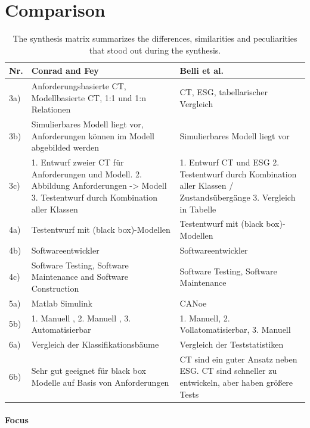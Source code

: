 \section{Comparison}
\label{Kap:Comparison}

\begin{small} 		
	\begin{longtable}[h]{p{0.45cm}|p{}|p{}}
	\caption{The synthesis matrix summarizes the differences, similarities and peculiarities that stood out during the synthesis.}
	\label{tab:synthesematrix_julian}
	\\    %
	\hline
	\textbf{Nr.} & \textbf{Conrad and Fey} & \textbf{Belli et al.} \\
	\hline
	3a) & Anforderungsbasierte CT, Modellbasierte CT,  1:1 und 1:n Relationen & CT, ESG, tabellarischer Vergleich \\
	\hline	
	3b) & Simulierbares Modell liegt vor, Anforderungen können im Modell abgebilded werden & Simulierbares Modell liegt vor \\
	\hline	
	3c) & 1. Entwurf zweier CT für Anforderungen und Modell. 2. Abbildung Anforderungen -> Modell 3. Testentwurf durch Kombination aller Klassen & 1. Entwurf CT und ESG 2. Testentwurf durch Kombination aller Klassen / Zustandsübergänge 3. Vergleich in Tabelle \\
	\hline	
	4a) & Testentwurf mit (black box)-Modellen & Testentwurf mit (black box)-Modellen \\
	\hline	
	4b) & Softwareentwickler & Softwareentwickler \\
	\hline	
	4c) & Software Testing, Software Maintenance and Software Construction & Software Testing, Software Maintenance \\
	\hline
	5a) & Matlab Simulink & CANoe \\
	\hline
	5b) & 1. Manuell , 2. Manuell , 3. Automatisierbar & 1. Manuell, 2. Vollatomatisierbar, 3. Manuell \\
	\hline	
	6a) & Vergleich der Klassifikationsbäume & 
	Vergleich der Teststatistiken  \\
	\hline	
	6b) & Sehr gut geeignet für black box Modelle auf Basis von Anforderungen & CT sind ein guter Ansatz neben ESG. CT sind schneller zu entwickeln, aber haben größere Tests \\
	\hline	
	\end{longtable}
\end{small}


\newpage
\paragraph{Focus}

